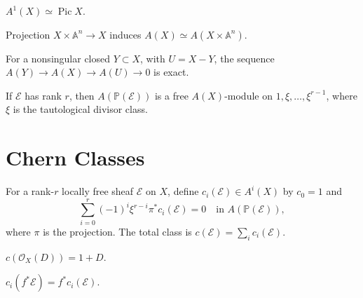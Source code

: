 \begin{convention}
\label{ha-appA-A8}
$A^1(X)\simeq\operatorname{Pic}X$.
\end{convention}

\begin{convention}
\label{ha-appA-A9}
Projection $X\times\mathbb A^n\to X$ induces
$A(X)\simeq A(X\times\mathbb A^n)$.
\end{convention}

\begin{convention}[Localization]
\label{ha-appA-A10}
For a nonsingular closed $Y\subset X$, with $U=X-Y$, the sequence
$A(Y)\to A(X)\to A(U)\to0$ is exact.
\end{convention}

\begin{convention}
\label{ha-appA-A11}
If $\mathcal E$ has rank $r$, then $A(\mathbb P(\mathcal E))$ is a free
$A(X)$-module on $1,\xi,\ldots,\xi^{r-1}$, where $\xi$ is the tautological
divisor class.
\end{convention}

\section{Chern Classes}
\label{ha-appA-sec3}

\begin{definition}
For a rank-$r$ locally free sheaf $\mathcal E$ on $X$, define
$c_i(\mathcal E)\in A^i(X)$ by $c_0=1$ and
\[
\sum_{i=0}^r(-1)^i\xi^{r-i}\pi^*c_i(\mathcal E)=0
\quad\text{in }A(\mathbb P(\mathcal E)),
\]
where $\pi$ is the projection.  The total class is
$c(\mathcal E)=\sum_i c_i(\mathcal E)$.
\end{definition}

\begin{convention}
\label{ha-appA-C1}
$c(\mathcal O_X(D))=1+D$.
\end{convention}

\begin{convention}
\label{ha-appA-C2}
$c_i(f^*\mathcal E)=f^*c_i(\mathcal E)$.
\end{convention}

